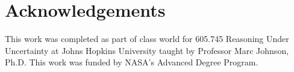 \section{Acknowledgements}\label{sec:Acknowledgements}
This work was completed as part of class world for 605.745 Reasoning Under Uncertainty at Johns Hopkins University taught by Professor Marc Johnson, Ph.D.
This work was funded by NASA's Advanced Degree Program.